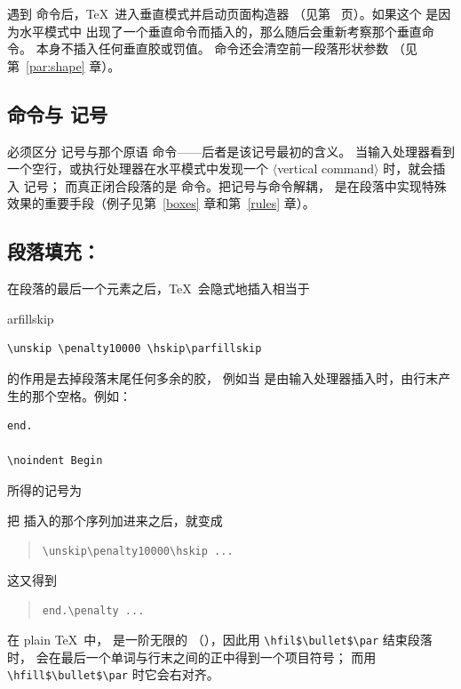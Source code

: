 \documentclass[a4paper]{rapport3}
\makeatletter
\def\gr#1{$\langle$#1$\rangle$}\def\key#1{{\tt#1}}
\newenvironment{disp}{\begin{quotation}}{\end{quotation}}
\def\gram#1{\gr{#1}}%
\def\cstoidx#1\par{\index{#1@\cs{#1}}}
\makeatother
\begin{document}
遇到  命令后，\TeX\ 进入垂直模式并启动页面构造器
（见第~\pageref{par:page:build} 页）。如果这个  是因为水平模式中
出现了一个垂直命令而插入的，那么随后会重新考察那个垂直命令。
 本身不插入任何垂直胶或罚值。 命令还会清空前一段落形状参数
（见第~\ref{par:shape} 章）。

\subsection{ 命令与  记号}

必须区分  记号与那个原语  命令——后者是该记号最初的含义。
当输入处理器看到一个空行，或执行处理器在水平模式中发现一个
\gram{vertical command} 时，就会插入  记号；
而真正闭合段落的是  命令。把记号与命令解耦，
是在段落中实现特殊效果的重要手段（例子见第~\ref{boxes} 章和第~\ref{rules} 章）。


\subsection{段落填充：}

在段落的最后一个元素之后，\TeX\ 会隐式地插入相当于
\cstoidx parfillskip\par
\begin{verbatim}
\unskip \penalty10000 \hskip\parfillskip
\end{verbatim}
 的作用是去掉段落末尾任何多余的胶，
例如当  是由输入处理器插入时，由行末产生的那个空格。例如：
\begin{verbatim}
end.

\noindent Begin
\end{verbatim}
所得的记号为
\begin{disp} \end{disp}
把  插入的那个序列加进来之后，就变成
\begin{disp}\verb>\unskip\penalty10000\hskip ...>\end{disp}
这又得到
\begin{disp}\verb>end.\penalty ...>\end{disp}

在 plain \TeX\ 中， 是一阶无限的
（），因此用 \verb.\hfil$\bullet$\par. 结束段落时，
会在最后一个单词与行末之间的正中得到一个项目符号；
而用 \verb.\hfill$\bullet$\par. 时它会右对齐。
\end{document}
